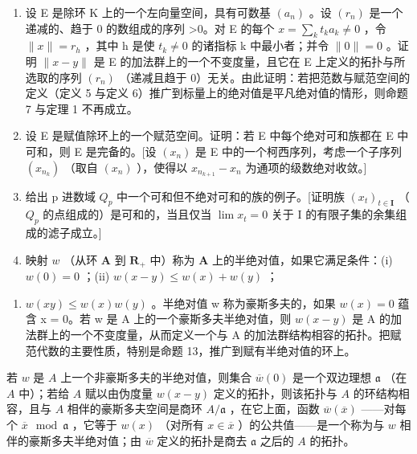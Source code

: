 \begin{enumerate}
\def\labelenumi{\arabic{enumi})}
\setcounter{enumi}{5}
\item
  设 E 是除环 K 上的一个左向量空间，具有可数基 \((a_{n})\) 。设 \((r_{n})\) 是一个递减的、趋于 0 的数组成的序列 \textgreater0。对 E 的每个 \(x = \sum_{k} t_{k} a_{k} \neq 0\) ，令 \(\|x\| = r_{h}\) ，其中 h 是使 \(t_{k} \neq 0\) 的诸指标 k 中最小者；并令 \(\|0\| = 0\) 。证明 \(\|x - y\|\) 是 E 的加法群上的一个不变度量，且它在 E 上定义的拓扑与所选取的序列 \((r_{n})\) （递减且趋于 0）无关。由此证明：若把范数与赋范空间的定义（定义 5 与定义 6）推广到标量上的绝对值是平凡绝对值的情形，则命题 7 与定理 1 不再成立。
\item
  设 E 是赋值除环上的一个赋范空间。证明：若 E 中每个绝对可和族都在 E 中可和，则 E 是完备的。{[}设 \((x_{n})\) 是 E 中的一个柯西序列，考虑一个子序列 \((x_{n_{k}})\) （取自 \((x_{n})\) ），使得以 \(x_{n_{k+1}} - x_{n}\) 为通项的级数绝对收敛。{]}
\item
  给出 p 进数域 \(Q_{p}\) 中一个可和但不绝对可和的族的例子。{[}证明族 \((x_{t})_{t\in\mathbf{I}}\) （\(Q_{p}\) 的点组成的）是可和的，当且仅当 \(\lim x_{t}=0\) 关于 I 的有限子集的余集组成的滤子成立。{]}
\item
  映射 \(w\) （从环 \(\mathbf{A}\) 到 \(\mathbf{R}_+\) 中）称为 \(\mathbf{A}\) 上的半绝对值，如果它满足条件：(i) \(w(\mathrm{0}) = \mathrm{0}\) ；(ii) \(w(x - y) \leqslant w(x) + w(y)\) ；
\end{enumerate}

\begin{enumerate}
\def\labelenumi{(\roman{enumi})}
\setcounter{enumi}{2}
\tightlist
\item
  \(w(xy) \leqslant w(x)w(y)\) 。半绝对值 w 称为豪斯多夫的，如果 \(w(x) = 0\) 蕴含 x = 0。若 w 是 A 上的一个豪斯多夫半绝对值，则 \(w(x - y)\) 是 A 的加法群上的一个不变度量，从而定义一个与 A 的加法群结构相容的拓扑。把赋范代数的主要性质，特别是命题 13，推广到赋有半绝对值的环上。
\end{enumerate}

若 \(w\) 是 \(A\) 上一个非豪斯多夫的半绝对值，则集合 \(\overline{w}(0)\) 是一个双边理想 \(\mathfrak{a}\) （在 \(A\) 中）；若给 \(A\) 赋以由伪度量 \(w(x - y)\) 定义的拓扑，则该拓扑与 \(A\) 的环结构相容，且与 \(A\) 相伴的豪斯多夫空间是商环 \(A / \mathfrak{a}\) ，在它上面，函数 \(\overline{w}(\overline{x})\) ——对每个 \(\overline{x} \mod \mathfrak{a}\) ，它等于 \(w(x)\) （对所有 \(x \in \overline{x}\) ）的公共值——是一个称为与 \(w\) 相伴的豪斯多夫半绝对值；由 \(\overline{w}\) 定义的拓扑是商去 \(\mathfrak{a}\) 之后的 \(A\) 的拓扑。

